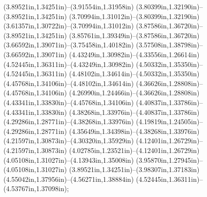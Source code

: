 (3.89521in,1.34251in)--(3.91554in,1.31958in) (3.80399in,1.32190in)--(3.89521in,1.34251in) (3.70994in,1.31012in)--(3.80399in,1.32190in) (3.61357in,1.30722in)--(3.70994in,1.31012in) (3.87586in,1.36720in)--(3.89521in,1.34251in) (3.85761in,1.39349in)--(3.87586in,1.36720in) (3.66592in,1.39071in)--(3.75458in,1.40182in) (3.57508in,1.38798in)--(3.66592in,1.39071in) (4.43249in,1.30982in)--(4.33556in,1.26614in) (4.52445in,1.36311in)--(4.43249in,1.30982in) (4.50332in,1.35350in)--(4.52445in,1.36311in) (4.48102in,1.34614in)--(4.50332in,1.35350in) (4.45768in,1.34106in)--(4.48102in,1.34614in) (4.36626in,1.28808in)--(4.45768in,1.34106in) (4.26990in,1.24466in)--(4.36626in,1.28808in) (4.43341in,1.33830in)--(4.45768in,1.34106in) (4.40837in,1.33786in)--(4.43341in,1.33830in) (4.38268in,1.33976in)--(4.40837in,1.33786in) (4.29286in,1.28771in)--(4.38268in,1.33976in) (4.19819in,1.24505in)--(4.29286in,1.28771in) (4.35649in,1.34398in)--(4.38268in,1.33976in) (4.21597in,1.30873in)--(4.30320in,1.35929in) (4.12401in,1.26729in)--(4.21597in,1.30873in) (4.02785in,1.23521in)--(4.12401in,1.26729in) (4.05108in,1.31027in)--(4.13943in,1.35008in) (3.95870in,1.27945in)--(4.05108in,1.31027in) (3.89521in,1.34251in)--(3.98307in,1.37183in) (4.55042in,1.37956in)--(4.56271in,1.38884in) (4.52445in,1.36311in)--(4.53767in,1.37098in);
